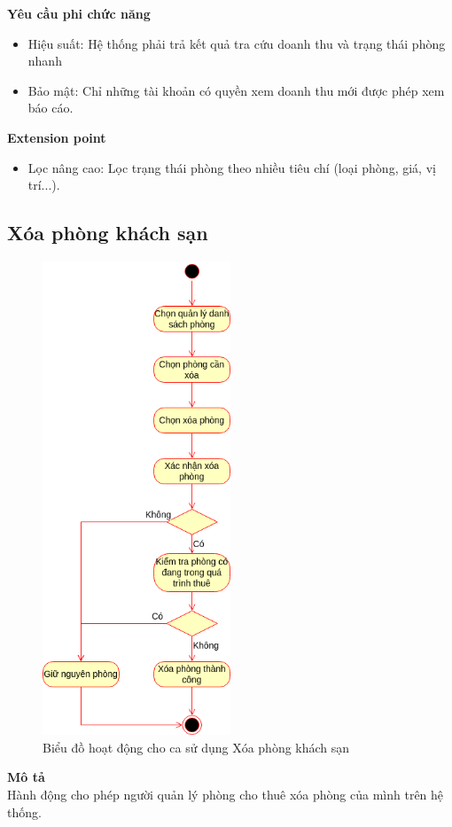 \textbf{Yêu cầu phi chức năng}
\begin{itemize}
    \item Hiệu suất: Hệ thống phải trả kết quả tra cứu doanh thu và trạng thái phòng nhanh
    \item Bảo mật: Chỉ những tài khoản có quyền xem doanh thu mới được phép xem báo cáo.
\end{itemize}

\textbf{Extension point}
\begin{itemize}
    \item Lọc nâng cao: Lọc trạng thái phòng theo nhiều tiêu chí (loại phòng, giá, vị trí...).
\end{itemize}



\subsection{Xóa phòng khách sạn}
\begin{figure}[H]
    \centering
    \includegraphics[width=0.5\textwidth]{img/1.Việt-Xóa phòng đang cho thuê.drawio.png}
    \caption{Biểu đồ hoạt động cho ca sử dụng Xóa phòng khách sạn}
\end{figure}
\textbf{\indent Mô tả}\\
\indent Hành động cho phép người quản lý phòng cho thuê xóa phòng của mình trên hệ thống.

